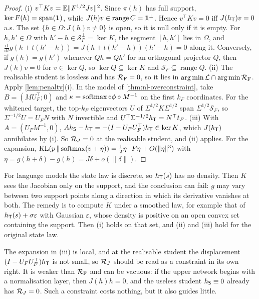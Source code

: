 \begin{proof}
(i) $v^\top Kv=\mathbb{E}\|F^{1/2}Jv\|^2$. Since $\pi(h)$ has full support, $\ker F(h)=\operatorname{span}(\mathbf{1})$, while
$J(h)v\in\operatorname{range}C=\mathbf{1}^\perp$. Hence $v^\top Kv=0$ iff $J(h_{\mathsf{T}})v=0$ a.s. The set $\{h\in\Omega:J(h)v\neq0\}$ is open, so it is
null only if it is empty. For $h,h'\in\Omega$ with $h'-h\in\mathcal S_F^\perp=\ker K$, the segment $[h,h']$ lies in $\Omega$, and
$\frac{\mathrm d}{\mathrm dt}g(h+t(h'-h))=J(h+t(h'-h))(h'-h)=0$ along it. Conversely, if $g(h)=g(h')$ whenever $Qh=Qh'$ for an
orthogonal projector $Q$, then $J(h)v=0$ for $v\in\ker Q$, so $\ker Q\subseteq\ker K$ and $\mathcal S_F\subseteq\operatorname{range}Q$.
(ii) The realisable student is lossless and has $\mathcal{R}_{\mathrm F}=0$, so it lies in $\operatorname*{arg\,min}\mathcal{L}\cap\operatorname*{arg\,min}\mathcal{R}_{\mathrm F}$. Apply
\cref{lem:penalty}(i). In the model of \cref{thm:nl-overconstraint}, take $B=(MU_F^\top;0)$ and $\kappa=\operatorname{softmax}\circ\phi\circ M^{-1}$ on the
first $k_F$ coordinates. For the whitened target, the top-$k_F$ eigenvectors $U$ of $\Sigma^{1/2}K\Sigma^{1/2}$ span
$\Sigma^{1/2}\mathcal S_F$, so $\Sigma^{-1/2}U=U_FN$ with $N$ invertible and $U^\top\Sigma^{-1/2}h_{\mathsf{T}}=N^\top t_F$.
(iii) With $A=(U_FM^{-1},0)$, $Ah_{\mathsf{S}}-h_{\mathsf{T}}=-(I-U_FU_F^\top)h_{\mathsf{T}}\in\ker K$, which $J(h_{\mathsf{T}})$ annihilates by (i). So $\mathcal{R}_J=0$ at the
realisable student, and (ii) applies. For the expansion, $\mathrm{KL}(p\,\|\operatorname{softmax}(v+\eta))=\frac12\eta^\top F\eta+O(\|\eta\|^3)$ with
$\eta=g(h+\delta)-g(h)=J\delta+o(\|\delta\|)$.
\end{proof}
\noindent
For language models the state law is discrete, so $h_{\mathsf{T}}(s)$ has no density. Then $K$ sees the Jacobian only on the
support, and the conclusion can fail: $g$ may vary between two support points along a direction in which its
derivative vanishes at both. The remedy is to compute $K$ under a smoothed law, for example that of
$h_{\mathsf{T}}(s)+\sigma\varepsilon$ with Gaussian $\varepsilon$, whose density is positive on an open convex set containing the support.
Then (i) holds on that set, and (ii) and (iii) hold for the original state law.

The expansion in (iii) is local, and at the realisable student the displacement $(I-U_FU_F^\top)h_{\mathsf{T}}$ is not small, so
$\mathcal{R}_J$ should be read as a constraint in its own right. It is weaker than $\mathcal{R}_{\mathrm F}$ and can be vacuous: if the upper
network begins with a normalisation layer, then $J(h)h=0$, and the useless student $h_{\mathsf{S}}\equiv0$ already has $\mathcal{R}_J=0$.
Such a constraint costs nothing, but it also guides little.

